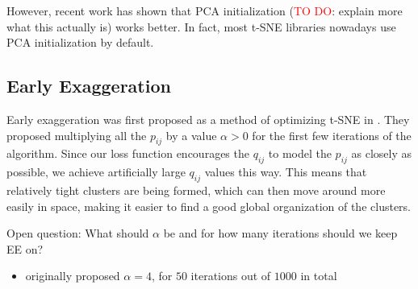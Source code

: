 However, recent work \cite{kobak21} has shown that PCA initialization (\textcolor{red}{TO DO}: explain more what this actually is) works better. In fact, most t-SNE libraries nowadays use PCA initialization by default. 

\subsection{Early Exaggeration}
Early exaggeration was first proposed as a method of optimizing t-SNE in \cite{vdMaa08}. They proposed multiplying all the $p_{ij}$ by a value $\alpha > 0$ for the first few iterations of the algorithm. Since our loss function encourages the $q_{ij}$ to model the $p_{ij}$ as closely as possible, we achieve artificially large $q_{ij}$ values this way. This means that relatively tight clusters are being formed, which can then move around more easily in space, making it easier to find a good global organization of the clusters. 

Open question: What should $\alpha$ be and for how many iterations should we keep EE on? 
\begin{itemize}
    \item \cite{vdMaa08} originally proposed $\alpha = 4$, for $50$ iterations out of $1000$ in total 
\end{itemize}

